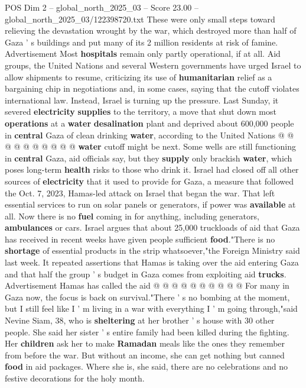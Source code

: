 \begin{textsample}{POS Dim 2 – global\_north\_2025\_03 – Score 23.00 – global\_north\_2025\_03/122398720.txt}
These were only small steps toward relieving the devastation wrought by the war, which destroyed more than half of Gaza ' s buildings and put many of its 2 million residents at risk of famine.
Advertisement Most \textbf{hospitals} remain only partly operational, if at all.
Aid groups, the United Nations and several Western governments have urged Israel to allow shipments to resume, criticizing its use of \textbf{humanitarian} relief as a bargaining chip in negotiations and, in some cases, saying that the cutoff violates international law.
Instead, Israel is turning up the pressure.
Last Sunday, it severed \textbf{electricity} \textbf{supplies} to the territory, a move that shut down most \textbf{operations} at a \textbf{water} \textbf{desalination} plant and deprived about 600,000 people in \textbf{central} Gaza of clean drinking \textbf{water}, according to the United Nations @ @ @ @ @ @ @ @ @ @ \textbf{water} cutoff might be next.
Some wells are still functioning in \textbf{central} Gaza, aid officials say, but they \textbf{supply} only brackish \textbf{water}, which poses long-term \textbf{health} risks to those who drink it.
Israel had closed off all other sources of \textbf{electricity} that it used to provide for Gaza, a measure that followed the Oct. 7, 2023, Hamas-led attack on Israel that began the war.
That left essential services to run on solar panels or generators, if power was \textbf{available} at all.
Now there is no \textbf{fuel} coming in for anything, including generators, \textbf{ambulances} or cars.
Israel argues that about 25,000 truckloads of aid that Gaza has received in recent weeks have given people sufficient \textbf{food}."There is no \textbf{shortage} of essential products in the strip whatsoever,"the Foreign Ministry said last week.
It repeated assertions that Hamas is taking over the aid entering Gaza and that half the group ' s budget in Gaza comes from exploiting aid \textbf{trucks}.
Advertisement Hamas has called the aid @ @ @ @ @ @ @ @ @ @ For many in Gaza now, the focus is back on survival."There ' s no bombing at the moment, but I still feel like I ' m living in a war with everything I ' m going through,"said Nevine Siam, 38, who is \textbf{sheltering} at her brother ' s house with 30 other people.
She said her sister ' s entire family had been killed during the fighting.
Her \textbf{children} ask her to make \textbf{Ramadan} meals like the ones they remember from before the war.
But without an income, she can get nothing but canned \textbf{food} in aid packages.
Where she is, she said, there are no celebrations and no festive decorations for the holy month.

\end{textsample}
